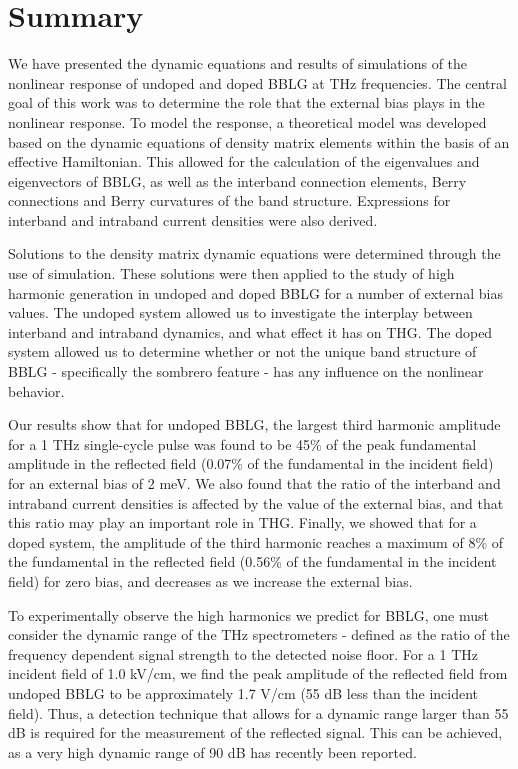 \documentclass[twocolumn,secnumarabic,amssymb, nobibnotes, aps, prd, superscriptaddress]{revtex4-1}
\begin{document}
\vspace{5mm} 
\section{Summary}\label{sec:4}
We have presented the dynamic equations and results of simulations of the nonlinear response of undoped and doped BBLG at THz frequencies. The central goal of this work was to determine the role that the external bias plays in the nonlinear response. To model the response, a theoretical model was developed based on the dynamic equations of density matrix elements within the basis of an effective Hamiltonian. This allowed for the calculation of the eigenvalues and eigenvectors of BBLG, as well as the interband connection elements, Berry connections and Berry curvatures of the band structure. Expressions for interband and intraband current densities were also derived.  

Solutions to the density matrix dynamic equations were determined through the use of simulation. These solutions were then applied to the study of high harmonic generation in undoped and doped BBLG for a number of external bias values. The undoped system allowed us to investigate the interplay between interband and intraband dynamics, and what effect it has on THG. The doped system allowed us to determine whether or not the unique band structure of BBLG - specifically the sombrero feature - has any influence on the nonlinear behavior. 

Our results show that for undoped BBLG, the largest third harmonic amplitude for a 1 THz single-cycle pulse was found to be 45\% of the peak fundamental amplitude in the reflected field (0.07\% of the fundamental in the incident field) for an external bias of 2 meV. We also found that the ratio of the interband and intraband current densities is affected by the value of the external bias, and that this ratio may play an important role in THG. Finally, we showed that for a doped system, the amplitude of the third harmonic reaches a maximum of 8\% of the fundamental in the reflected field (0.56\% of the fundamental in the incident field) for zero bias, and decreases as we increase the external bias.

To experimentally observe the high harmonics we predict for BBLG, one must consider the dynamic range of the THz spectrometers - defined as the ratio of the frequency dependent signal strength to the detected noise floor\cite{jepsen2005dynamic}. For a 1 THz  incident field of 1.0 kV/cm, we find the peak amplitude of the reflected field from undoped BBLG to be approximately 1.7 V/cm (55 dB less than the incident field). Thus, a detection technique that allows for a dynamic range larger than 55 dB is required for the measurement of the reflected signal. This can be achieved, as a very high dynamic range of 90 dB has recently been reported\cite{vieweg2014terahertz}. 




\end{document}
